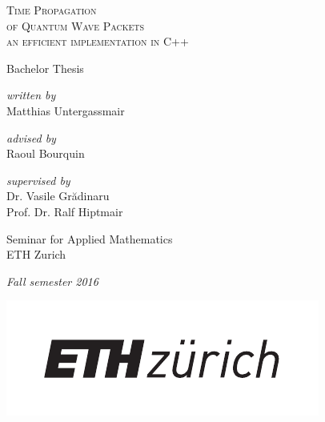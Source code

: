 \begin{titlepage}
	\begin{center}

		\hfill

		\vspace{2cm}

		{\huge \textsc{Time Propagation\\ of Quantum Wave Packets\\[10pt]}}
		{\Large \textsc{an efficient implementation in C++\\[10pt]}}

		\vspace{1cm}

		{\Large{Bachelor Thesis}}

		\vspace{1cm}

		{\emph{written by}} \\
		{
			Matthias Untergassmair
		}

		\vspace{1cm}

		{\emph{advised by}} \\
		{
			Raoul Bourquin
		}

		\vspace{1cm}

		{\emph{supervised by}} \\
		{
			Dr. Vasile Gr\u{a}dinaru\\
			Prof. Dr. Ralf Hiptmair
		}
		
		\vfill

		Seminar for Applied Mathematics\\
		ETH Zurich

		\vspace{.5cm}

		\emph{{Fall semester 2016}}

		\vspace{.5cm}

		\includegraphics[width=0.5\linewidth]{figures/eth-logo.pdf}

	\end{center}

\end{titlepage}
